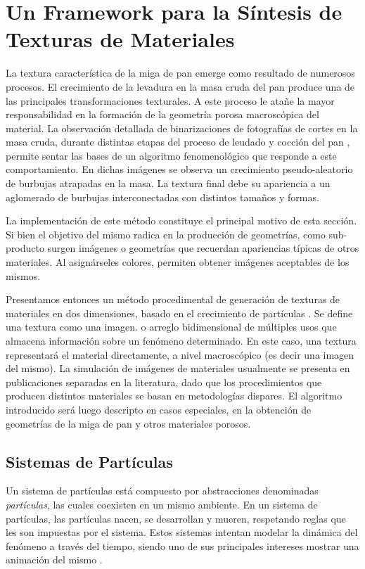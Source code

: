 \section[Síntesis de Texturas de Materiales]{Un Framework para la Síntesis de Texturas de Materiales}

La textura característica de la miga de pan emerge como resultado de numerosos procesos.
El crecimiento de la levadura en la masa cruda del pan produce una de las principales transformaciones texturales.
A este proceso le atañe la mayor responsabilidad en la formación de la geometría porosa macroscópica del material.
La observación detallada de binarizaciones de fotografías de cortes en la masa cruda, durante distintas etapas del proceso de leudado y cocción del pan \cite{Scanlon2001}, permite sentar las bases de un algoritmo fenomenológico que responde a este comportamiento.
En dichas imágenes se observa un crecimiento pseudo-aleatorio de burbujas atrapadas en la masa.
La textura final debe su apariencia a un aglomerado de burbujas interconectadas con distintos tamaños y formas.

La implementación de este método constituye el principal motivo de esta sección.
Si bien el objetivo del mismo radica en la producción de geometrías, como sub-producto surgen imágenes o geometrías que recuerdan apariencias típicas de otros materiales.
Al asignárseles colores, permiten obtener imágenes aceptables de los mismos.

Presentamos entonces un método procedimental de generación de texturas de materiales en dos dimensiones, basado en el crecimiento de partículas \cite{Reeves1983}.
Se define una textura como una imagen. o arreglo bidimensional de múltiples usos que almacena información sobre un fenómeno determinado.
En este caso, una textura representará el material directamente, a nivel macroscópico (es decir una imagen del mismo).
La simulación de imágenes de materiales usualmente se presenta en publicaciones separadas en la literatura, dado que los procedimientos que producen distintos materiales se basan en metodologías dispares.
El algoritmo introducido será luego descripto en casos especiales, en la obtención de geometrías de la miga de pan y otros materiales porosos.

\subsection{Sistemas de Partículas}
Un sistema de partículas está compuesto por abstracciones denominadas {\em partículas}, las cuales coexisten en un mismo ambiente.
En un sistema de part\'iculas, las part\'iculas nacen, se desarrollan y mueren, respetando reglas que les son impuestas por el sistema. Estos sistemas intentan modelar la din\'amica del fen\'omeno a trav\'es del tiempo, siendo uno de sus principales intereses mostrar una animaci\'on del mismo \cite{Gao2010, Bagar2010, Lentine2010}.

